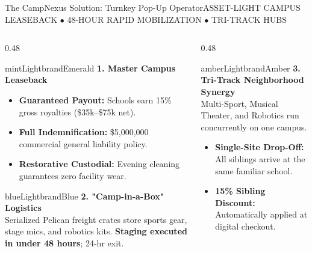 \documentclass[aspectratio=169,9pt]{beamer}
\begin{document}
\begin{frame}{The CampNexus Solution: Turnkey Pop-Up Operator}{ASSET-LIGHT CAMPUS LEASEBACK $\bullet$ 48-HOUR RAPID MOBILIZATION $\bullet$ TRI-TRACK HUBS}

\begin{columns}[T]
  \begin{column}{0.48\textwidth}
    \begin{execbox}{mintLight}{brandEmerald}
      \textcolor{brandEmerald}{\textbf{\scriptsize 1. Master Campus Leaseback}} \\[2pt]
      \tiny
      \begin{itemize}
        \item \textbf{Guaranteed Payout:} Schools earn 15\% gross royalties (\$35k--\$75k net).
        \item \textbf{Full Indemnification:} \$5,000,000 commercial general liability policy.
        \item \textbf{Restorative Custodial:} Evening cleaning guarantees zero facility wear.
      \end{itemize}
    \end{execbox}

    \vskip2pt
    \begin{execbox}{blueLight}{brandBlue}
      \textcolor{brandBlue}{\textbf{\scriptsize 2. "Camp-in-a-Box" Logistics}} \\[2pt]
      \tiny
      Serialized Pelican freight crates store sports gear, stage mics, and robotics kits. \textbf{Staging executed in under 48 hours}; 24-hr exit.
    \end{execbox}
  \end{column}

  \begin{column}{0.48\textwidth}
    \begin{execbox}{amberLight}{brandAmber}
      \textcolor{brandAmber}{\textbf{\scriptsize 3. Tri-Track Neighborhood Synergy}} \\[2pt]
      \tiny
      Multi-Sport, Musical Theater, and Robotics run concurrently on one campus.
      \begin{itemize}
        \item \textbf{Single-Site Drop-Off:} All siblings arrive at the same familiar school.
        \item \textbf{15\% Sibling Discount:} Automatically applied at digital checkout.
      \end{itemize}
    \end{execbox}


\end{column}
\end{columns}
\end{frame}
\end{document}

